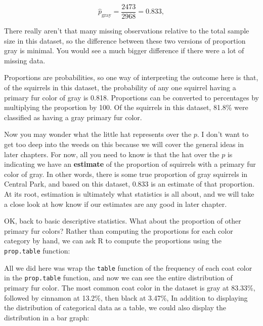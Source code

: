 \documentclass[
]{book}
\newenvironment{Shaded}{\begin{snugshade}}{\end{snugshade}}
\newcommand{\CommentTok}[1]{\textcolor[rgb]{0.56,0.35,0.01}{\textit{#1}}}
\newcommand{\ErrorTok}[1]{\textcolor[rgb]{0.64,0.00,0.00}{\textbf{#1}}}
\newcommand{\FloatTok}[1]{\textcolor[rgb]{0.00,0.00,0.81}{#1}}
\newcommand{\FunctionTok}[1]{\textcolor[rgb]{0.13,0.29,0.53}{\textbf{#1}}}
\newcommand{\NormalTok}[1]{#1}
\newcommand{\SpecialCharTok}[1]{\textcolor[rgb]{0.81,0.36,0.00}{\textbf{#1}}}
\begin{document}
\[
\hat{p}_{\text{gray}} = \frac{2473}{2968} = 0.833,
\]

There really aren't that many missing observations relative to the total sample size in this dataset, so the difference between these two versions of proportion gray is minimal. You would see a much bigger difference if there were a lot of missing data.

Proportions are probabilities, so one way of interpreting the outcome here is that, of the squirrels in this dataset, the probability of any one squirrel having a primary fur color of gray is 0.818. Proportions can be converted to percentages by multiplying the proportion by 100. Of the squirrels in this dataset, 81.8\% were classified as having a gray primary fur color.

Now you may wonder what the little hat represents over the \(p\). I don't want to get too deep into the weeds on this because we will cover the general ideas in later chapters. For now, all you need to know is that the hat over the \(p\) is indicating we have an \textbf{estimate} of the proportion of squirrels with a primary fur color of gray. In other words, there is some true proportion of gray squirrels in Central Park, and based on this dataset, 0.833 is an estimate of that proportion. At its root, estimation is ultimately what statistics is all about, and we will take a close look at how know if our estimates are any good in later chapter.

OK, back to basic descriptive statistics. What about the proportion of other primary fur colors? Rather than computing the proportions for each color category by hand, we can ask R to compute the proportions using the \texttt{prop.table} function:

\begin{Shaded}
\end{Shaded}

All we did here was wrap the \texttt{table} function of the frequency of each coat color in the \texttt{prop.table} function, and now we can see the entire distribution of primary fur color. The most common coat color in the dataset is gray at 83.33\%, followed by cinnamon at 13.2\%, then black at 3.47\%, In addition to displaying the distribution of categorical data as a table, we could also display the distribution in a bar graph:
\end{document}
